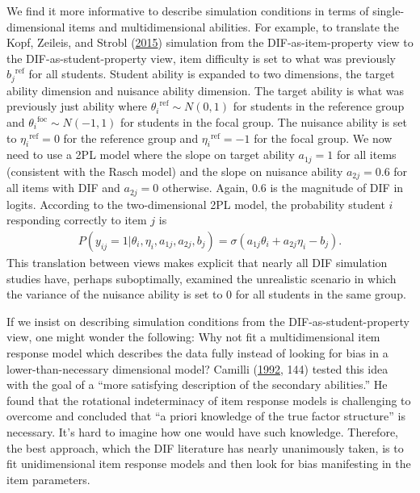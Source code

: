 \documentclass[
  11pt,
]{article}
\begin{document}
We find it more informative to describe simulation conditions in terms of single-dimensional items and multidimensional abilities. For example, to translate the Kopf, Zeileis, and Strobl (\protect\hyperlink{ref-kopf2015framework}{2015}) simulation from the DIF-as-item-property view to the DIF-as-student-property view, item difficulty is set to what was previously \({b_j}^{\text{ref}}\) for all students. Student ability is expanded to two dimensions, the target ability dimension and nuisance ability dimension. The target ability is what was previously just ability where \({\theta_i}^{\text{ref}} \sim N(0,1)\) for students in the reference group and \({\theta_i}^{\text{foc}} \sim N(-1,1)\) for students in the focal group. The nuisance ability is set to \({\eta_i}^{\text{ref}} = 0\) for the reference group and \({\eta_i}^{\text{ref}} = -1\) for the focal group. We now need to use a 2PL model where the slope on target ability \(a_{1j} = 1\) for all items (consistent with the Rasch model) and the slope on nuisance ability \(a_{2j} = 0.6\) for all items with DIF and \(a_{2j} = 0\) otherwise. Again, 0.6 is the magnitude of DIF in logits. According to the two-dimensional 2PL model, the probability student \(i\) responding correctly to item \(j\) is
\begin{align}
    P(y_{ij} = 1 | \theta_i, \eta_i, a_{1j}, a_{2j}, b_j) = \sigma(a_{1j}\theta_i + a_{2j}\eta_i - b_j).
\end{align}
This translation between views makes explicit that nearly all DIF simulation studies have, perhaps suboptimally, examined the unrealistic scenario in which the variance of the nuisance ability is set to 0 for all students in the same group.

If we insist on describing simulation conditions from the DIF-as-student-property view, one might wonder the following: Why not fit a multidimensional item response model which describes the data fully instead of looking for bias in a lower-than-necessary dimensional model? Camilli (\protect\hyperlink{ref-camilli1992conceptual}{1992}, 144) tested this idea with the goal of a \enquote{more satisfying description of the secondary abilities.} He found that the rotational indeterminacy of item response models is challenging to overcome and concluded that \enquote{a priori knowledge of the true factor structure} is necessary. It's hard to imagine how one would have such knowledge. Therefore, the best approach, which the DIF literature has nearly unanimously taken, is to fit unidimensional item response models and then look for bias manifesting in the item parameters.
\end{document}
